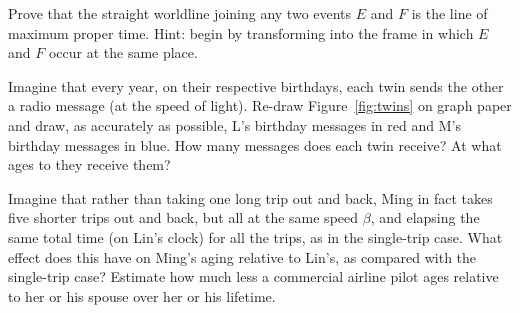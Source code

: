 \begin{problem}
Prove that the straight worldline joining any two events $E$ and $F$
is the line of maximum proper time.  Hint: begin by transforming into
the frame in which $E$ and $F$ occur at the same place.
\end{problem}

\begin{problem}
Imagine that every year, on their respective birthdays, each twin
sends the other a radio message (at the speed of light).  Re-draw
Figure~\ref{fig:twins} on graph paper and draw, as accurately as
possible, L's birthday messages in red and M's birthday messages in
blue.  How many messages does each twin receive?  At what ages to they
receive them?
\end{problem}

\begin{problem}
Imagine that rather than taking one long trip out and back, Ming in
fact takes five shorter trips out and back, but all at the same speed
$\beta$, and elapsing the same total time (on Lin's clock) for all the
trips, as in the single-trip case.  What effect does this have on
Ming's aging relative to Lin's, as compared with the single-trip
case?  Estimate how much less a commercial airline pilot ages relative
to her or his spouse over her or his lifetime.
\end{problem}
